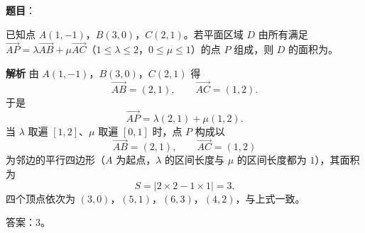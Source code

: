 \begin{answer}

\textbf{题目}：

已知点 $A(1,-1)$，$B(3,0)$，$C(2,1)$。若平面区域 $D$ 由所有满足 $\overrightarrow{AP}=\lambda\overrightarrow{AB}+\mu\overrightarrow{AC}$（$1\leqslant\lambda\leqslant2$，$0\leqslant\mu\leqslant1$）的点 $P$ 组成，则 $D$ 的面积为\gkblank{}。

\textbf{解析}
由 $A(1,-1)$，$B(3,0)$，$C(2,1)$ 得
\nopagebreak[4]
\[\overrightarrow{AB}=(2,1),\qquad\overrightarrow{AC}=(1,2).\]
于是
\nopagebreak[4]
\[\overrightarrow{AP}=\lambda(2,1)+\mu(1,2).\]
当 $\lambda$ 取遍 $[1,2]$、$\mu$ 取遍 $[0,1]$ 时，点 $P$ 构成以
\nopagebreak[4]
\[\overrightarrow{AB}=(2,1),\qquad\overrightarrow{AC}=(1,2)\]
为邻边的平行四边形（$A$ 为起点，$\lambda$ 的区间长度与 $\mu$ 的区间长度都为 $1$），其面积为
\nopagebreak[4]
\[S=\left|2\times2-1\times1\right|=3.\]
四个顶点依次为 $(3,0)$，$(5,1)$，$(6,3)$，$(4,2)$，与上式一致。

答案：$3$。


\end{answer}
